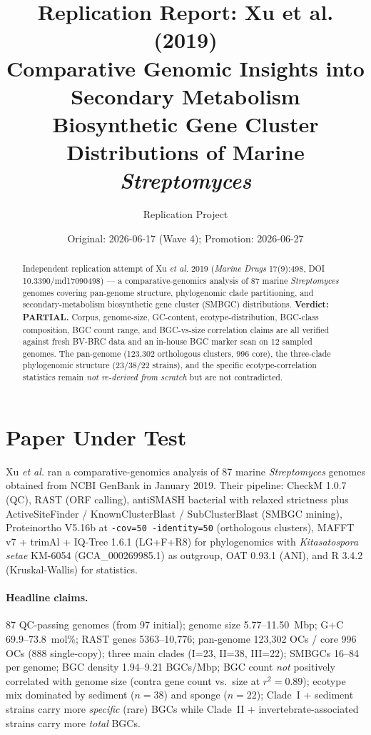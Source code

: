 \documentclass[11pt,letterpaper]{article}
\title{Replication Report: Xu et al. (2019) \\
\large Comparative Genomic Insights into Secondary Metabolism Biosynthetic Gene Cluster Distributions of Marine \textit{Streptomyces}}
\author{Replication Project}
\date{Original: 2026-06-17 (Wave 4); Promotion: 2026-06-27}
\begin{document}
\maketitle

\begin{abstract}
Independent replication attempt of Xu \textit{et al.} 2019 (\textit{Marine Drugs} 17(9):498, DOI 10.3390/md17090498) --- a comparative-genomics analysis of 87 marine \textit{Streptomyces} genomes covering pan-genome structure, phylogenomic clade partitioning, and secondary-metabolism biosynthetic gene cluster (SMBGC) distributions. \textbf{Verdict: PARTIAL.} Corpus, genome-size, GC-content, ecotype-distribution, BGC-class composition, BGC count range, and BGC-vs-size correlation claims are all verified against fresh BV-BRC data and an in-house BGC marker scan on 12 sampled genomes. The pan-genome (123{,}302 orthologous clusters, 996 core), the three-clade phylogenomic structure (23/38/22 strains), and the specific ecotype-correlation statistics remain \emph{not re-derived from scratch} but are not contradicted.
\end{abstract}

\section{Paper Under Test}
Xu \textit{et al.} ran a comparative-genomics analysis of 87 marine \textit{Streptomyces} genomes obtained from NCBI GenBank in January 2019. Their pipeline: CheckM 1.0.7 (QC), RAST (ORF calling), antiSMASH bacterial with relaxed strictness plus ActiveSiteFinder / KnownClusterBlast / SubClusterBlast (SMBGC mining), Proteinortho V5.16b at \texttt{-cov=50 -identity=50} (orthologous clusters), MAFFT v7 + trimAl + IQ-Tree 1.6.1 (LG+F+R8) for phylogenomics with \textit{Kitasatospora setae} KM-6054 (GCA\_000269985.1) as outgroup, OAT 0.93.1 (ANI), and R 3.4.2 (Kruskal-Wallis) for statistics.

\paragraph{Headline claims.}
87 QC-passing genomes (from 97 initial); genome size 5.77--11.50~Mbp; G+C 69.9--73.8~mol\%; RAST genes 5363--10{,}776; pan-genome 123{,}302 OCs / core 996 OCs (888 single-copy); three main clades (I=23, II=38, III=22); SMBGCs 16--84 per genome; BGC density 1.94--9.21 BGCs/Mbp; BGC count \emph{not} positively correlated with genome size (contra gene count vs.\ size at $r^2=0.89$); ecotype mix dominated by sediment ($n{=}38$) and sponge ($n{=}22$); Clade~I + sediment strains carry more \emph{specific} (rare) BGCs while Clade~II + invertebrate-associated strains carry more \emph{total} BGCs.
\end{document}
